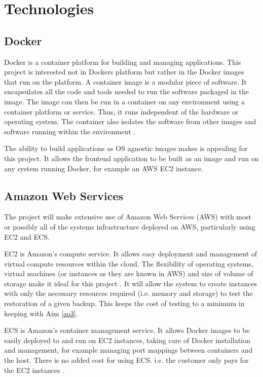
\section{Technologies}

\subsection{Docker}
Docker is a container platform for building and managing applications. This project is interested not in Dockers platform but rather in the Docker images that run on the platform. A container image is a modular piece of software. It encapsulates all the code and tools needed to run the software packaged in the image. The image can then be run in a container on any environment using a container platform or service. Thus, it runs independent of the hardware or operating system. The container also isolates the software from other images and software running within the environment \citep{docker}.

The ability to build applications as OS agnostic images makes is appealing for this project. It allows the frontend application to be built as an image and run on any system running Docker, for example an AWS EC2 instance. 


\subsection{Amazon Web Services}
The project will make extensive use of Amazon Web Services (AWS) with most or possibly all of the systems infrastructure deployed on AWS, particularly using EC2 and ECS.

EC2 is Amazon's compute service. It allows easy deployment and management of virtual compute resources within the cloud. The flexibility of operating systems, virtual machines (or instances as they are known in AWS) and size of volume of storage make it ideal for this project \citep{ec2}. It will allow the system to create instances with only the necessary resources required (i.e. memory and storage) to test the restoration of a given backup. This keeps the cost of testing to a minimum in keeping with Aim \ref{ao3}.

ECS is Amazon's container management service. It allows Docker images to be easily deployed to and run on  EC2 instances, taking care of Docker installation and management, for example managing port mappings between containers and the host. There is no added cost for using ECS. i.e. the customer only pays for the EC2 instances \citep{ecs}. 

